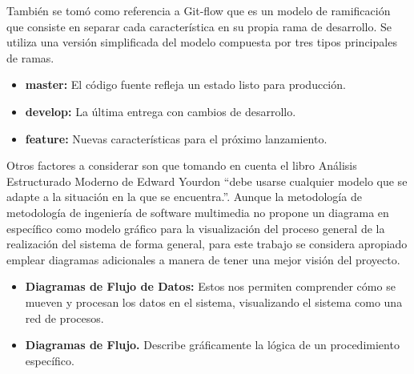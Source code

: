 También se tomó como referencia a Git-flow\cite{driessen2010successful} que es un modelo de ramificación que consiste en separar cada característica en su propia rama de desarrollo.
 Se utiliza una versión simplificada del modelo\cite{krusche2014introduction} compuesta por tres tipos principales de ramas.\\
\begin{itemize}
\item \textbf{master:} El código fuente refleja un estado listo para producción.
\item \textbf{develop:} La última entrega con cambios de desarrollo.
\item \textbf{feature:} Nuevas características para el próximo lanzamiento.
\end{itemize}
Otros factores a considerar son que tomando en cuenta el libro Análisis Estructurado Moderno de Edward Yourdon “debe usarse cualquier modelo que se adapte a la situación en la
 que se encuentra.”\cite{edward1989modern}. Aunque la metodología de metodología de ingeniería de software multimedia no propone un diagrama en específico como modelo gráfico para 
 la visualización del proceso general de la realización del sistema de forma general, para este trabajo se considera apropiado emplear diagramas adicionales a manera de tener una 
 mejor visión del proyecto.\\
\begin{itemize}
\item \textbf{Diagramas de Flujo de Datos:}  Estos nos permiten comprender cómo se mueven y procesan los datos en el sistema, visualizando el sistema como una red de procesos.
\item \textbf{Diagramas de Flujo.} Describe gráficamente la lógica de un procedimiento específico.
\end{itemize}

